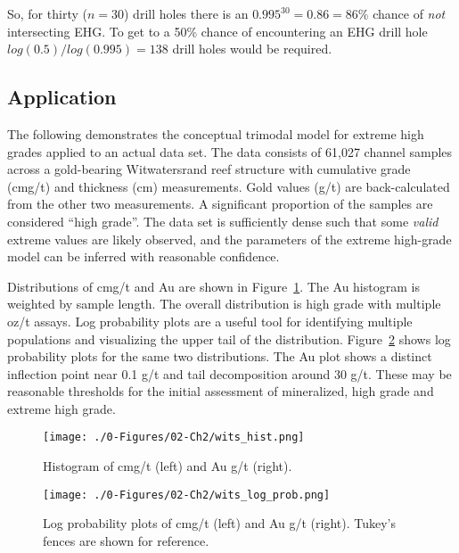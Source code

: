 So, for thirty ($n=30$) drill holes there is an $0.995^{30}=0.86=86\%$ chance of {\em not} intersecting EHG.  To get to a 50\% chance of encountering an EHG drill hole $log(0.5)/log(0.995)=138$ drill holes would be required.


\FloatBarrier
\subsection{Application}

The following demonstrates the conceptual trimodal model for extreme high grades applied to an actual data set. The data consists of 61,027 channel samples across a gold-bearing Witwatersrand reef structure with cumulative grade (cmg/t) and thickness (cm) measurements. Gold values (g/t) are back-calculated from the other two measurements. A significant proportion of the samples are considered ``high grade''. The data set is sufficiently dense such that some \emph{valid} extreme values are likely observed, and the parameters of the extreme high-grade model can be inferred with reasonable confidence. 

Distributions of cmg/t and Au are shown in Figure~\ref{fig:wits_hist}. The Au histogram is weighted by sample length. The overall distribution is high grade with multiple oz/t assays. Log probability plots are a useful tool for identifying multiple populations and visualizing the upper tail of the distribution. Figure~\ref{fig:wits_log_prob} shows log probability plots for the same two distributions. The Au plot shows a distinct inflection point near 0.1 g/t and tail decomposition around 30 g/t. These may be reasonable thresholds for the initial assessment of mineralized, high grade and extreme high grade. 

\begin{figure}[htb!]
    \centering
    \texttt{[image: ./0-Figures/02-Ch2/wits\_hist.png]}
    \caption{Histogram of cmg/t (left) and Au g/t (right).}
    \label{fig:wits_hist}
\end{figure}

\begin{figure}[htb!]
    \centering
    \texttt{[image: ./0-Figures/02-Ch2/wits\_log\_prob.png]}
    \caption{Log probability plots of cmg/t (left) and Au g/t (right). Tukey's fences are shown for reference.}
    \label{fig:wits_log_prob}
\end{figure}

